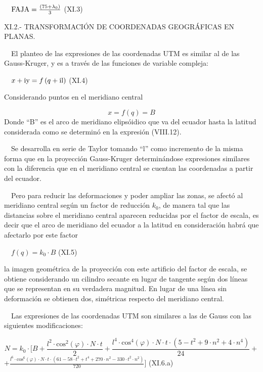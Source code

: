 \documentclass{tufte-book}
\newcommand\normalsubformula[1]{\text{\mathversion{normal}$#1$}}
\begin{document}
\ \  ${\normalsubformula{\text{FAJA}}=\frac{\left(\text{75}+\lambda
_{{0}}\right)}{3}}$  (XI.3)

XI.2.- TRANSFORMACIÓN DE COORDENADAS GEOGRÁFICAS EN PLANAS.

\ \ El planteo de las expresiones de las coordenadas UTM es similar al
de las Gauss-Kruger, y es a través de las funciones de variable
compleja:

\ \ 
${x+\normalsubformula{\text{iy}}=f\left(q+\normalsubformula{\text{il}}\right)}$
 (XI.4)

Considerando puntos en el meridiano central

\begin{equation*}
{x=f\left(q\right)=B}
\end{equation*}
Donde {\textquotedblleft}B{\textquotedblright} es el arco de meridiano
elipsóidico que va del ecuador hasta la latitud considerada como se
determinó en la expresión (VIII.12).

\ \ Se desarrolla en serie de Taylor tomando
{\textquotedblleft}l{\textquotedblright} como incremento de la misma
forma que en la proyección Gauss-Kruger determinándose expresiones
similares con la diferencia que en el meridiano central se cuentan las
coordenadas a partir del ecuador.

\ \ Pero para reducir las deformaciones y poder ampliar las zonas, se
afectó al meridiano central según un factor de reducción 
${k_{{0}}}$, de manera tal que las distancias sobre el meridiano
central aparecen reducidas por el factor de escala, es decir que el
arco de meridiano del ecuador a la latitud en consideración habrá
que afectarlo por este factor

\ \  ${f\left(q\right)=k_{{0}}\cdot B}$  (XI.5)

la imagen geométrica de la proyección con este artificio del factor
de escala, se obtiene considerando un cilindro secante en lugar de
tangente según dos líneas que se representan en su verdadera
magnitud. En lugar de una línea sin deformación se obtienen dos,
simétricas respecto del meridiano central.

\ \ Las expresiones de las coordenadas UTM son similares a las de Gauss
con las siguientes modificaciones:

\begin{equation*}
{N=k_{{0}}\cdot [B+\frac{l^{{2}}\cdot \text{cos}^{{2}}\left(\varphi
\right)\cdot N\cdot t}{2}+\frac{l^{{4}}\cdot
\text{cos}^{{4}}\left(\varphi \right)\cdot N\cdot t\cdot
\left(5-t^{{2}}+9\cdot n^{{2}}+4\cdot n^{{4}}\right)}{\text{24}}+}
\end{equation*}
 ${+{\frac{l^{{6}}\cdot \text{cos}^{{6}}\left(\varphi \right)\cdot
N\cdot t\cdot \left(\text{61}-\text{58}\cdot
t^{{2}}+t^{{4}}+\text{270}\cdot n^{{2}}-\text{330}\cdot t^{{2}}\cdot
n^{{2}}\right)}{\text{720}}}]}$  (XI.6.a)
\end{document}
